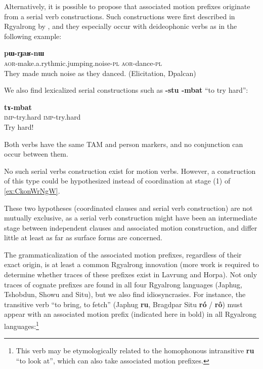 \documentclass[oldfontcommands,twoside,a4paper,12pt]{article}
\newcommand{\ipa}[1]{{\phon\textbf{#1}}}
\newcommand{\aor}{\textsc{aor}}
\newcommand{\pl}{\textsc{pl}}
\begin{document}
Alternatively, it is possible to propose that associated motion prefixes originate from a serial verb   constructions.
Such constructions were first described in Rgyalrong by \citet[490]{sun12complementation}, and they especially occur with deideophonic verbs as in the following   example:

\begin{exe}
\ex  
\gll \ipa{pɯ-ɣɤzgrɤɣlɤɣ-nɯ}   	\ipa{pɯ-rɟaʁ-nɯ}    \\
  \aor{}-make.a.rythmic.jumping.noise-\pl{} \aor{}-dance-\pl{}\\
\glt They made much noise as they danced.  (Elicitation, Dpalcan)
\end{exe}
We also find  lexicalized serial constructions such as \ipa{-stu -mbat} ``to try hard'':
\begin{exe}
\ex  
\gll \ipa{tɤ-stu}   	\ipa{tɤ-mbat}    \\
\textsc{imp}-try.hard \textsc{imp}-try.hard \\
\glt  Try hard!
\end{exe}
Both verbs have the same TAM and person markers, and no conjunction can occur between them.

No such serial verbs construction exist for motion verbs. However, a construction of this type could be hypothesized instead of coordination at stage (1) of \ref{ex:CkonWrNgW}.

These two hypotheses (coordinated clauses and serial verb construction) are not mutually exclusive,  as a serial verb construction might have been an intermediate stage between independent clauses and associated motion construction, and differ little at least as far as surface forms are concerned.

The grammaticalization of the associated motion prefixes, regardless of their exact origin, is at least a common Rgyalrong innovation (more work is required to determine whether traces of these prefixes exist in Lavrung and Horpa). Not only traces of cognate prefixes are found in all four Rgyalrong languages (Japhug, Tshobdun, Showu and Situ), but we also find idiosyncrasies. For instance, the transitive verb ``to bring, to fetch'' (Japhug \ipa{ru}, Bragdpar Situ \ipa{ró} / \ipa{rô}) must appear with an associated motion prefix (indicated here in bold) in all Rgyalrong languages:\footnote{This verb may be etymologically related to the homophonous intransitive \ipa{ru} ``to look at'', which can also take associated motion prefixes.}
\end{document}
